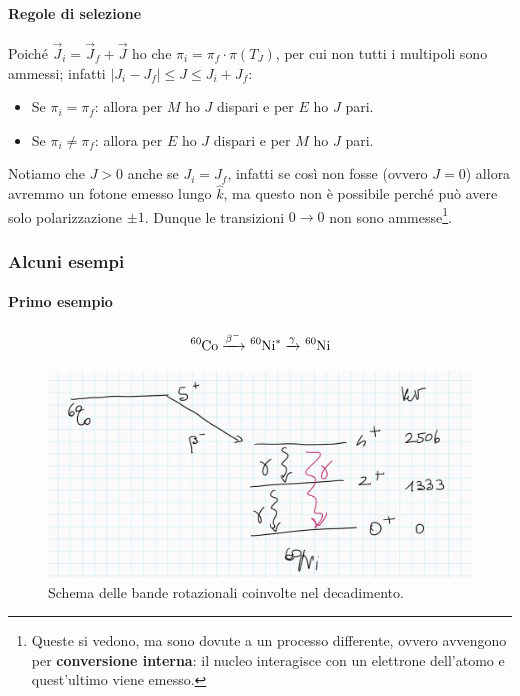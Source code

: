 \paragraph{Regole di selezione} Poiché $\vec{J}_i = \vec{J}_f + \vec{J}$ ho che $\pi_i = \pi_f \cdot \pi(T_J)$, per cui non tutti i multipoli sono ammessi; infatti $|J_i - J_f|\leq J\leq J_i+J_f$:
\begin{itemize}
    \item Se $\pi_i = \pi_f$: allora per $M$ ho $J$ dispari e per $E$ ho $J$ pari.
    \item Se $\pi_i \not = \pi_f$: allora per $E$ ho $J$ dispari e per $M$ ho $J$ pari.
\end{itemize}
Notiamo che $J > 0$ anche se $J_i=J_f$, infatti se così non fosse (ovvero $J=0$) allora avremmo un fotone emesso lungo $\hat{k}$, ma questo non è possibile perché può avere solo polarizzazione $\pm 1$. Dunque le transizioni $0\to 0$ non sono ammesse\footnote{Queste si vedono, ma sono dovute a un processo differente, ovvero avvengono per \textbf{conversione interna}: il nucleo interagisce con un elettrone dell'atomo e quest'ultimo viene emesso.}.

\subsubsection{Alcuni esempi}
\paragraph{Primo esempio}
$$\ce{^{60}Co}  \xrightarrow{\beta^-} \ce{^{60}Ni}^*  \xrightarrow{\gamma}  \ce{^{60}Ni}$$

\begin{figure}[h]
    \centering
    \includegraphics[scale=0.2]{Immagini/0310_bande.png}
    \caption{Schema delle bande rotazionali coinvolte nel decadimento.}
    \label{0310_bande}
\end{figure}

